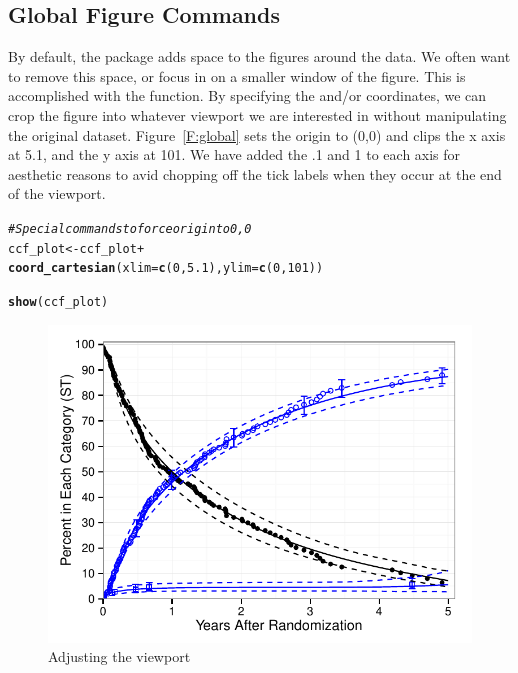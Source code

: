 \documentclass[nojss]{jss}\usepackage[]{graphicx}\usepackage[]{color}
\makeatletter
\def\maxwidth{ %
  \ifdim\Gin@nat@width>\linewidth
    \linewidth
  \else
    \Gin@nat@width
  \fi
}
\newcommand{\hlnum}[1]{\textcolor[rgb]{0.686,0.059,0.569}{#1}}%
\newcommand{\hlcom}[1]{\textcolor[rgb]{0.678,0.584,0.686}{\textit{#1}}}%
\newcommand{\hlopt}[1]{\textcolor[rgb]{0,0,0}{#1}}%
\newcommand{\hlstd}[1]{\textcolor[rgb]{0.345,0.345,0.345}{#1}}%
\newcommand{\hlkwb}[1]{\textcolor[rgb]{0.69,0.353,0.396}{#1}}%
\newcommand{\hlkwc}[1]{\textcolor[rgb]{0.333,0.667,0.333}{#1}}%
\newcommand{\hlkwd}[1]{\textcolor[rgb]{0.737,0.353,0.396}{\textbf{#1}}}%
\newenvironment{kframe}{%
 \def\at@end@of@kframe{}%
 \ifinner\ifhmode%
  \def\at@end@of@kframe{\end{minipage}}%
  \begin{minipage}{\columnwidth}%
 \fi\fi%
 \def\FrameCommand##1{\hskip\@totalleftmargin \hskip-\fboxsep
 \colorbox{shadecolor}{##1}\hskip-\fboxsep
     \hskip-\linewidth \hskip-\@totalleftmargin \hskip\columnwidth}%
 \MakeFramed {\advance\hsize-\width
   \@totalleftmargin\z@ \linewidth\hsize
   \@setminipage}}%
 {\par\unskip\endMakeFramed%
 \at@end@of@kframe}
\newenvironment{knitrout}{}{} %
\makeatother
\begin{document}
\subsection{Global Figure Commands}\label{S:globals}
By default, the  package adds space to the figures around the data. We often want to remove this space, or focus in on a smaller window of the figure. This is accomplished with the  function. By specifying the  and/or  coordinates, we can crop the figure into whatever viewport we are interested in without manipulating the original dataset. Figure~\ref{F:global} sets the origin to (0,0) and clips the x axis at 5.1, and the y axis at 101. We have added the .1 and 1 to each axis for aesthetic reasons to avid chopping off the tick labels when they occur at the end of the viewport.
\begin{knitrout}\footnotesize
{}\color{fgcolor}\begin{kframe}
\begin{alltt}
\hlcom{# Special commands to force origin to 0,0}
\hlstd{ccf_plot} \hlkwb{<-} \hlstd{ccf_plot} \hlopt{+}
  \hlkwd{coord_cartesian}\hlstd{(}\hlkwc{xlim}\hlstd{=}\hlkwd{c}\hlstd{(}\hlnum{0}\hlstd{,}\hlnum{5.1}\hlstd{),} \hlkwc{ylim}\hlstd{=}\hlkwd{c}\hlstd{(}\hlnum{0}\hlstd{,}\hlnum{101}\hlstd{))}

\hlkwd{show}\hlstd{(ccf_plot)}
\end{alltt}
\end{kframe}\begin{figure}[htpb]

{\centering \includegraphics[width=\maxwidth]{figure/beamer-global_-1} 

}

\caption[Adjusting the viewport]{Adjusting the viewport\label{F:global,}}
\end{figure}


\end{knitrout}
\end{document}
